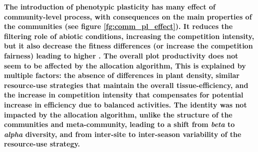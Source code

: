 \textbf{The introduction of phenotypic plasticity has many effect of community-level process, with consequences on the main properties of the communities (see figure \ref{fg:comm_pl_effect}). It reduces the filtering role of abiotic conditions, increasing the competition intensity, but it also decrease the fitness differences (or increase the competition fairness) leading to higher . The overall plot productivity does not seem to be affected by the allocation algorithm, This is explained by multiple factors: the absence of differences in plant density, similar resource-use strategies that maintain the overall tissue-efficiency, and the increase in competition intensity that compensates for potential increase in efficiency due to balanced activities. The identity was not impacted by the allocation algorithm, unlike the structure of the communities and meta-community, leading to a shift from \textit{beta} to \textit{alpha} diversity, and from inter-site to inter-season variability of the resource-use strategy.}


\begin{figure}%
    \classiccaptionstyle
{}
\end{figure}


